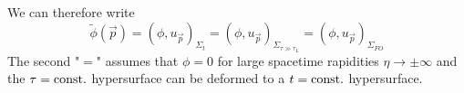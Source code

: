 We can therefore write
\begin{equation}
    \tilde{\phi}(\vec{p})=(\phi,u_{\vec{p}})_{\Sigma_t}=(\phi,u_{\vec{p}})_{\Sigma_{\tau\gg\tau_L}}=(\phi,u_{\vec{p}})_{\Sigma_{FO}}
\end{equation}
The second "$=$" assumes that $\phi=0$ for large spacetime rapidities $\eta\to\pm\infty$ and the $\tau={\text{const.}}$ hypersurface can be deformed to a $t={\text{const.}}$ hypersurface.

